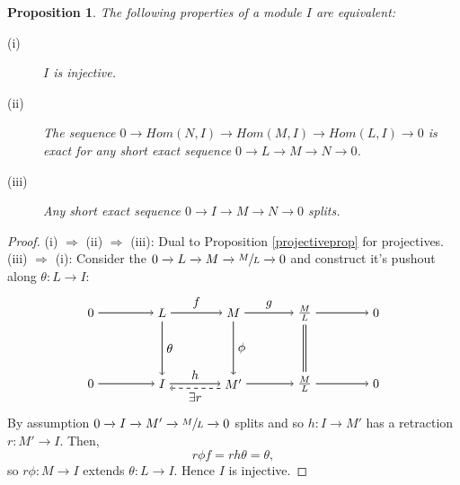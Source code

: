 \documentclass[11.5pt, twoside, a4paper, titlepage]{report}
\theoremstyle{definition}
\theoremstyle{plain}
\newtheorem{prop}[mydef]{Proposition}
\begin{document}
\begin{prop}
The following properties of a module $I$ are equivalent:
\begin{description}
\item [(i)] $I$ is injective.
\item [(ii)] The sequence $0\xrightarrow{} Hom(N, I) \xrightarrow{} Hom(M, I) \xrightarrow{} Hom(L, I) \xrightarrow{} 0$ is exact for any short exact sequence $0\xrightarrow{} L \xrightarrow{} M\xrightarrow{} N \xrightarrow {} 0$.
\item [(iii)] Any short exact sequence $0 \xrightarrow{} I \xrightarrow{} M \xrightarrow{} N \xrightarrow{}0$ splits.
\end{description}
\end{prop}
\begin{proof}
(i) $\Rightarrow$ (ii) $\Rightarrow$ (iii): Dual to Proposition \ref{projectiveprop}  for projectives.
(iii) $\Rightarrow$ (i): Consider the $0\xrightarrow{}L\xrightarrow{}M\xrightarrow{}\sfrac{M}{L} \xrightarrow{} 0$ and construct it's pushout along $\theta: L \to I$:
\begin{equation*}
\begin{tikzpicture}[->,-latex, auto, main path/.style={->, semithick}, main node/.style={}]

\node	[main node]		(2) at (2,0)		{$0$};
\node	[main node]		(3) at (4,0)		{$L$};
\node [main node]		(4) at (6,0)		{$M$};
\node [main node]		(5) at (8,0)		{$\frac{M}{L}$};
\node	[main node]		(11) at (10,0)	{$0$};

\node	[main node]		(7) at (2,-2)		{$0$};
\node	[main node]		(8) at (4,-2)		{$I$};
\node [main node]		(9) at (6,-2)		{$M'$};
\node [main node]		(10) at (8,-2)	{$\frac{M}{L}$};
\node [main node]		(13) at (10,-2)	{$0$};

\draw (2) edge [main path] node [auto] {$$} (3);
\draw (3) edge [main path] node [auto] {$f$} (4);
\draw (4) edge [main path] node [auto] {$g$} (5);
\draw (5) edge [main path] (11);

\draw (7) edge [main path] node [auto] {$$} (8);
\path (8.0) edge [main path] node [auto] {$h$} (9.180);
\path (9.200) edge [dashed, ->, semithick] node [auto] {$\exists r$} (8.330);
\draw (9) edge [main path] node [auto, swap] {$$} (10);
\draw (10) edge [main path] (13);

\draw (3) edge [main path] node [auto] {$\theta$} (8);
\draw (4) edge [main path] node [auto] {$\phi$} (9);
\draw (5) edge [-, semithick, double, double distance=1.5pt](10);
\end{tikzpicture}
\end{equation*}
By assumption $0\xrightarrow{}I\xrightarrow{}M'\xrightarrow{}\sfrac{M}{L}\xrightarrow{}0$ splits and so $h:I \to M'$ has a retraction $r:M'\to I$. Then,
\begin{equation*}
r\phi f=rh\theta=\theta,
\end{equation*}
so $r\phi : M \to I$ extends $\theta: L \to I$. Hence $I$ is injective.
\end{proof}
\end{document}
